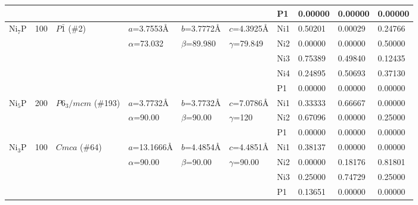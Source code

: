 \documentclass[twoside,twocolumn,9pt]{article}
\begin{document}
\begin{table}[t]
\begin{tabular*}{\textwidth}{@{\extracolsep{\fill}}llllllllll}
               &     &               &                  &                 &                  & P1  & 0.00000 & 0.00000 & 0.00000 \\
\midrule
    Ni$_{7}$P  & 100 & $P\bar{1}$ (\#2)     & $a$=3.7553\AA    & $b$=3.7772\AA   & $c$=4.3925\AA    & Ni1 &  0.50201 & 0.00029 & 0.24766 \\
               &     &               & $\alpha$=73.032 & $\beta$=89.980 & $\gamma$=79.849    & Ni2 &  0.00000 & 0.00000 & 0.50000 \\
               &     &               &                  &                 &                  & Ni3 &  0.75389 & 0.49840 & 0.12435 \\
               &     &               &                  &                 &                  & Ni4 &  0.24895 & 0.50693 & 0.37130 \\
               &     &               &                  &                 &                  & P1  &  0.00000 & 0.00000 & 0.00000 \\
\midrule
    Ni$_{5}$P  & 200 & $P6_3/mcm$ (\#193)  & $a$=3.7732\AA    & $b$=3.7732\AA   & $c$=7.0786\AA    & Ni1 & 0.33333   &  0.66667  &   0.00000  \\
               &     &                    & $\alpha$=90.00   & $\beta$=90.00 & $\gamma$=120       & Ni2 & 0.67096   &  0.00000  &   0.25000  \\
               &     &                    &                  &                 &                  & P1 &  0.00000    & 0.00000   &  0.00000  \\
\midrule
    Ni$_{3}$P  & 100 & $Cmca$ (\#64) & $a$=13.1666\AA   & $b$=4.4854\AA   & $c$=4.4851\AA    & Ni1 & 0.38137   &  0.00000  &   0.00000  \\
               &     &               & $\alpha$=90.00   & $\beta$=90.00   & $\gamma$=90.00   & Ni2 & 0.00000   &  0.18176  &   0.81801  \\
               &     &               &                  &                 &                  & Ni3 & 0.25000   &  0.74729  &   0.25000  \\   
               &     &               &                  &                 &                  & P1 &  0.13651    & 0.00000   &  0.00000  \\
\hline
  \end{tabular*}
\end{table}
\end{document}
